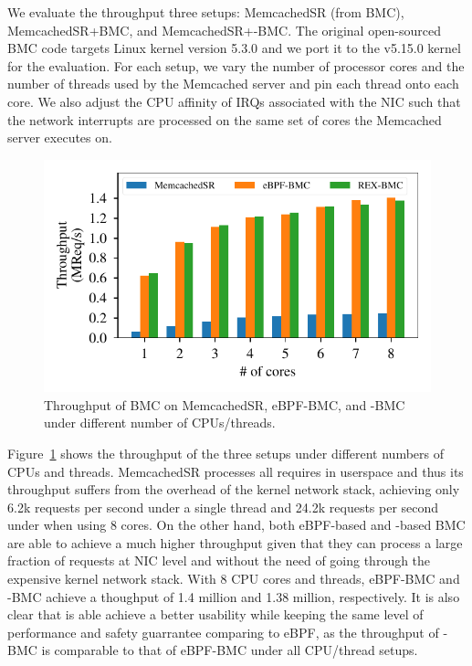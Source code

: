 We evaluate the throughput three setups: MemcachedSR (from BMC),
    MemcachedSR+BMC, and MemcachedSR+\projname{}-BMC.
The original open-sourced BMC code targets Linux kernel version 5.3.0 and we
    port it to the v5.15.0 \projname{} kernel for the evaluation.
For each setup, we vary the number of processor cores and the number of threads
    used by the Memcached server and pin each thread onto each core.
We also adjust the CPU affinity of IRQs associated with the NIC such that the
    network interrupts are processed on the same set of cores the Memcached
    server executes on.

\begin{figure}
    \includegraphics[width=1.0\linewidth]{figs/bmc.pdf}
    \centering
    \vspace{-25pt}
    \caption{Throughput of BMC on MemcachedSR, eBPF-BMC, and \projname{}-BMC
        under different number of CPUs/threads.
    }
    \label{fig:eval-bmc}
    \vspace{-10pt}
\end{figure}

Figure~\ref{fig:eval-bmc} shows the throughput of the three setups under
    different numbers of CPUs and threads.
MemcachedSR processes all requires in userspace and thus its throughput suffers
    from the overhead of the kernel network stack, achieving only 6.2k requests
    per second under a single thread and 24.2k requests per second under when
    using 8 cores.
On the other hand, both eBPF-based and \projname{}-based BMC are able to
    achieve a much higher throughput given that they can process a large
    fraction of requests at NIC level and without the need of going through
    the expensive kernel network stack.
With 8 CPU cores and threads, eBPF-BMC and \projname{}-BMC achieve a thoughput
    of 1.4 million and 1.38 million, respectively.
It is also clear that \projname{} is able achieve a better usability while
    keeping the same level of performance and safety guarrantee comparing to
    eBPF,  as the throughput of \projname{}-BMC is comparable to that of
    eBPF-BMC under all CPU/thread setups.